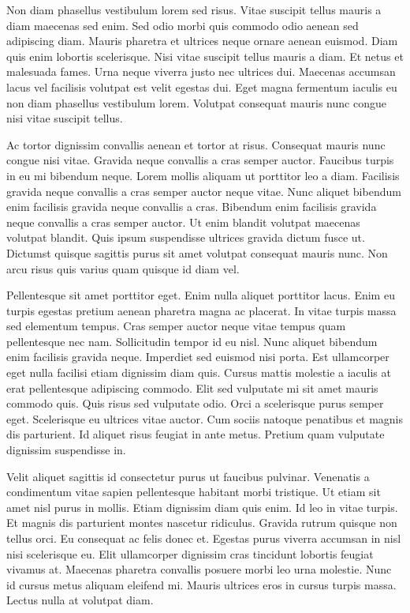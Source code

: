 Non diam phasellus vestibulum lorem sed risus. Vitae suscipit tellus mauris a
diam maecenas sed enim. Sed odio morbi quis commodo odio aenean sed adipiscing
diam. Mauris pharetra et ultrices neque ornare aenean euismod. Diam quis enim
lobortis scelerisque. Nisi vitae suscipit tellus mauris a diam. Et netus et
malesuada fames. Urna neque viverra justo nec ultrices dui. Maecenas accumsan
lacus vel facilisis volutpat est velit egestas dui. Eget magna fermentum
iaculis eu non diam phasellus vestibulum lorem. Volutpat consequat mauris nunc
congue nisi vitae suscipit tellus.

Ac tortor dignissim convallis aenean et tortor at risus. Consequat mauris nunc
congue nisi vitae. Gravida neque convallis a cras semper auctor. Faucibus
turpis in eu mi bibendum neque. Lorem mollis aliquam ut porttitor leo a diam.
Facilisis gravida neque convallis a cras semper auctor neque vitae. Nunc
aliquet bibendum enim facilisis gravida neque convallis a cras. Bibendum enim
facilisis gravida neque convallis a cras semper auctor. Ut enim blandit
volutpat maecenas volutpat blandit. Quis ipsum suspendisse ultrices gravida
dictum fusce ut. Dictumst quisque sagittis purus sit amet volutpat consequat
mauris nunc. Non arcu risus quis varius quam quisque id diam vel.

Pellentesque sit amet porttitor eget. Enim nulla aliquet porttitor lacus. Enim
eu turpis egestas pretium aenean pharetra magna ac placerat. In vitae turpis
massa sed elementum tempus. Cras semper auctor neque vitae tempus quam
pellentesque nec nam. Sollicitudin tempor id eu nisl. Nunc aliquet bibendum
enim facilisis gravida neque. Imperdiet sed euismod nisi porta. Est ullamcorper
eget nulla facilisi etiam dignissim diam quis. Cursus mattis molestie a iaculis
at erat pellentesque adipiscing commodo. Elit sed vulputate mi sit amet mauris
commodo quis. Quis risus sed vulputate odio. Orci a scelerisque purus semper
eget. Scelerisque eu ultrices vitae auctor. Cum sociis natoque penatibus et
magnis dis parturient. Id aliquet risus feugiat in ante metus. Pretium quam
vulputate dignissim suspendisse in.

Velit aliquet sagittis id consectetur purus ut faucibus pulvinar. Venenatis a
condimentum vitae sapien pellentesque habitant morbi tristique. Ut etiam sit
amet nisl purus in mollis. Etiam dignissim diam quis enim. Id leo in vitae
turpis. Et magnis dis parturient montes nascetur ridiculus. Gravida rutrum
quisque non tellus orci. Eu consequat ac felis donec et. Egestas purus viverra
accumsan in nisl nisi scelerisque eu. Elit ullamcorper dignissim cras tincidunt
lobortis feugiat vivamus at. Maecenas pharetra convallis posuere morbi leo urna
molestie. Nunc id cursus metus aliquam eleifend mi. Mauris ultrices eros in
cursus turpis massa. Lectus nulla at volutpat diam.
